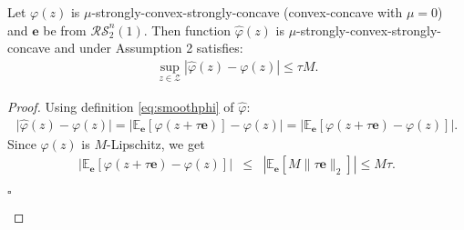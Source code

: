 \documentclass[runningheads]{llncs}
\newcommand{\EndProof}{\begin{flushright}$\square$\end{flushright}}
\begin{document}
\begin{lemma}
   Let ${\varphi}(z)$ is $\mu$-strongly-convex-strongly-concave (convex-concave with $\mu = 0$) and $\mathbf{e}$ be from $\mathcal{RS}^n_2(1)$. Then function $\hat{\varphi}(z)$ is $\mu$-strongly-convex-strongly-concave  and under Assumption 2 satisfies:
    \begin{eqnarray*}
        \sup_{z \in \mathcal{Z}} |\hat{\varphi}(z) - {\varphi}(z)| \leq \tau M. 
    \end{eqnarray*}
\end{lemma}
\begin{proof}
    Using definition \eqref{eq:smoothphi} of $\hat \varphi$:
    \begin{eqnarray*}
        \big|\hat{\varphi}(z) - {\varphi}(z)\big|= 
        \big|\mathbb{E}_{\mathbf{e}}[\varphi(z + \tau \mathbf{e})] - \varphi(z)\big| = \left|\mathbb{E}_{\mathbf{e}}\left[\varphi(z + \tau \mathbf{e}) - \varphi(z) \right] \right|.
    \end{eqnarray*}
    Since $\varphi(z)$ is $M$-Lipschitz, we get
    \begin{eqnarray*}
       \left|\mathbb{E}_{\mathbf{e}}\left[\varphi(z + \tau \mathbf{e}) - \varphi(z) \right]\right| &\leq&  \left|\mathbb{E}_{\mathbf{e}}\left[ M \|\tau \mathbf{e}\|_2 \right] \right| \leq M\tau .
    \end{eqnarray*}
    \EndProof
\end{proof}
\end{document}
